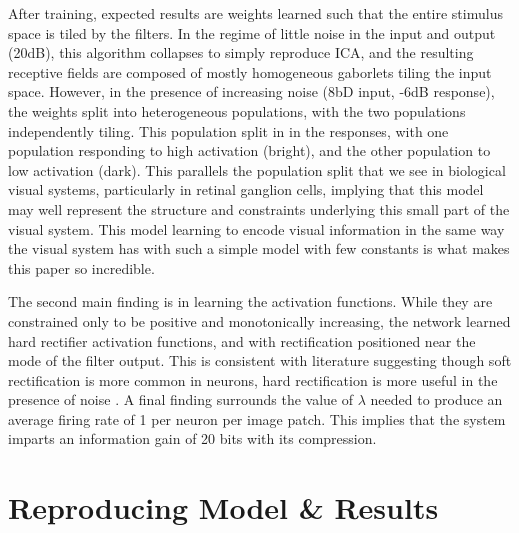 \documentclass{article}
\begin{document}
After training, expected results are weights learned such that the entire stimulus space is tiled by the filters. In the regime of little noise in the input and output (20dB), this algorithm collapses to simply reproduce ICA, and the resulting receptive fields are composed of mostly homogeneous gaborlets tiling the input space. However, in the presence of increasing noise (8bD input, -6dB response), the weights split into heterogeneous populations, with the two populations independently tiling. This population split in in the responses, with one population responding to high activation (bright), and the other population to low activation (dark). This parallels the population split that we see in biological visual systems, particularly in retinal ganglion cells, implying that this model may well represent the structure and constraints underlying this small part of the visual system. This model learning to encode visual information in the same way the visual system has with such a simple model with few constants is what makes this paper so incredible. \par
The second main finding is in learning the activation functions. While they are constrained only to be positive and monotonically increasing, the network learned hard rectifier activation functions, and with rectification positioned near the mode of the filter output. This is consistent with literature suggesting though soft rectification is more common in neurons, hard rectification is more useful in the presence of noise \cite{Caradini}. A final finding surrounds the value of $\lambda$ needed to produce an average firing rate of 1 per neuron per image patch. This implies that the system imparts an information gain of 20 bits with its compression. \par


\section{Reproducing Model \& Results}
\end{document}
